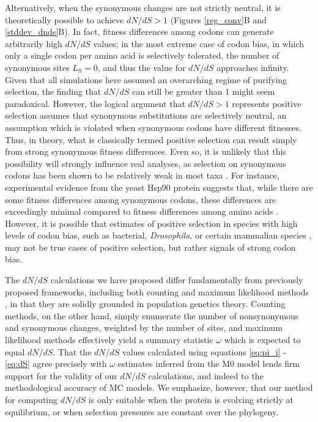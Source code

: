 \documentclass{pnastwo}
\begin{document}
\begin{article}
Alternatively, when the synonymous changes are not strictly neutral, it is theoretically possible to achieve $dN/dS > 1$ (Figures \ref{reg_conv}B and \ref{stddev_dnds}B). In fact, fitness differences among codons can generate arbitrarily high $dN/dS$ values; in the most extreme case of codon bias, in which only a single codon per amino acid is selectively tolerated, the number of synonymous sites $L_\text{S} = 0$, and thus the value for $dN/dS$ approaches infinity. Given that all simulations here assumed an overarching regime of purifying selection, the finding that $dN/dS$ can still be greater than 1 might seem paradoxical. However, the logical argument that $dN/dS > 1$ represents positive selection assumes that synonymous substitutions are selectively neutral, an assumption which is violated when synonymous codons have different fitnesses. Thus, in theory, what is classically termed positive selection can result simply from strong synonymous fitness differences. Even so, it is unlikely that this possibility will strongly influence real analyses, as selection on synonymous codons has been shown to be relatively weak in most taxa \cite{HershbergPetrov2008}. For instance, experimental evidence from the yeast Hsp90 protein suggests that, while there are some fitness differences among synonymous codons, these differences are exceedingly minimal compared to fitness differences among amino acids \cite{Hietpas2011,Hietpas2013}. However, it is possible that estimates of positive selection in species with high levels of codon bias, such as bacterial, \textit{Drosophila}, or certain mammalian species \cite{Duret2002, Chamaryetal2006, PlotkinKudla2010}, may not be true cases of positive selection, but rather signals of strong codon bias.

The $dN/dS$ calculations we have proposed differ fundamentally from previously proposed frameworks, including both counting \cite{LWL85,NG86,Pamilo1993,Ina1995,YN00} and maximum likelihood methods \cite{GoldmanYang1994,MuseGaut1994,Yang2006,Anisimova2009}, in that they are solidly grounded in population genetics theory. Counting methods, on the other hand, simply enumerate the number of nonsynonymous and synonymous changes, weighted by the number of sites, and maximum likelihood methods effectively yield a summary statistic $\omega$ which is expected to equal $dN/dS$. That the $dN/dS$ values calculated using equations \eqref{eq:pi_i} - \eqref{eq:dS} agree precisely with $\omega$ estimates inferred from the M0 model lends firm support for the validity of our $dN/dS$ calculations, and indeed to the methodological accuracy of MC models. We emphasize, however, that our method for computing $dN/dS$ is only suitable when the protein is evolving strictly at equilibrium, or when selection pressures are constant over the phylogeny.
 

\end{article}
\end{document}
